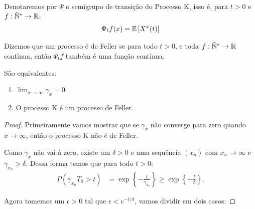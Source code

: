 \begin{definicao}
  \label{def:semigrupo}
  Denotaremos por $\Psi$ o semigrupo de transição do Processo K, isso
  é, para $t > 0$ e $f: {\mathbb{\bar{N}^*}} \to {\mathbb{R}}$:
  \begin{gather*}
    \Psi_t f (x) = {\mathbb{E}} \left[ X^x(t) \right]\\
  \end{gather*}
\end{definicao}

Dizemos que um processo é de Feller se para todo $t > 0$, e toda $f:
{\mathbb{\bar{N}^*}} \to {\mathbb{R}}$ contínua, então $\Psi_t f$ também é uma função contínua.


\begin{proposicao}
  São equivalentes:
  \begin{enumerate}
  \item $\lim_{x \to \infty} \gamma_x = 0$
  \item O processo K é um processo de Feller.
  \end{enumerate}
\end{proposicao}

\begin{proof}

  Primeiramente vamos mostrar que se $\gamma_x$ não converge para zero
  quando $x \to \infty$, então o processo K não é de Feller. 

  Como $\gamma_x$ não vai à zero, existe um $\delta > 0$ e uma
  sequência $(x_n)$ com $x_n \to \infty$ e $\gamma_{x_n} >
  \delta$. Dessa forma temos que para todo $t > 0$:
  \begin{align*}
    P(\gamma_{x_n} T_0 > t) &=
    \exp\left\{ -\frac{t}{\gamma_{x_n}}\right\}
    \geq  \exp\left\{ -\frac{t}{\delta}\right\}.
  \end{align*}

  Agora tomemos um $\epsilon > 0 $ tal que $\epsilon < e^{-t/\delta}$,
  vamos dividir em dois casos:


  



\end{proof}


